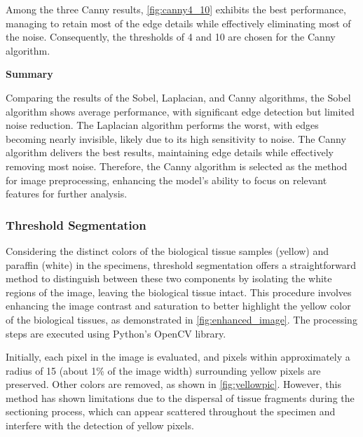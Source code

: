 Among the three Canny results, \autoref{fig:canny4_10} exhibits the best performance, managing to retain most of the edge details while effectively eliminating most of the noise. Consequently, the thresholds of 4 and 10 are chosen for the Canny algorithm.

\textbf{Summary}

Comparing the results of the Sobel, Laplacian, and Canny algorithms, the Sobel algorithm shows average performance, with significant edge detection but limited noise reduction. The Laplacian algorithm performs the worst, with edges becoming nearly invisible, likely due to its high sensitivity to noise. The Canny algorithm delivers the best results, maintaining edge details while effectively removing most noise. Therefore, the Canny algorithm is selected as the method for image preprocessing, enhancing the model's ability to focus on relevant features for further analysis.

\FloatBarrier


\subsubsection{Threshold Segmentation}

Considering the distinct colors of the biological tissue samples (yellow) and paraffin (white) in the specimens, threshold segmentation offers a straightforward method to distinguish between these two components by isolating the white regions of the image, leaving the biological tissue intact. This procedure involves enhancing the image contrast and saturation to better highlight the yellow color of the biological tissues, as demonstrated in \autoref{fig:enhanced_image}. The processing steps are executed using Python's OpenCV library.

Initially, each pixel in the image is evaluated, and pixels within approximately a radius of 15 (about 1\% of the image width) surrounding yellow pixels are preserved. Other colors are removed, as shown in \autoref{fig:yellowpic}. However, this method has shown limitations due to the dispersal of tissue fragments during the sectioning process, which can appear scattered throughout the specimen and interfere with the detection of yellow pixels.

